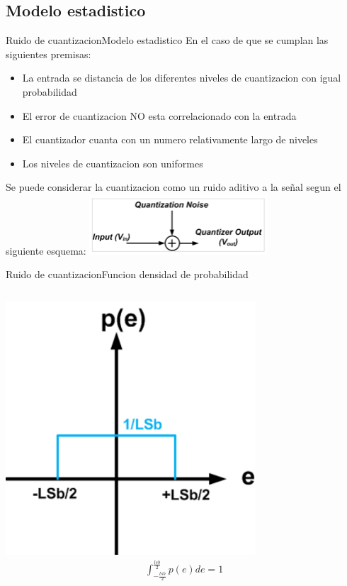  \subsection{Modelo estadistico}
 \begin{frame}{Ruido de cuantizacion}{Modelo estadistico}
    En el caso de que se cumplan las siguientes premisas:
    \begin{itemize}
       \item La entrada se distancia de los diferentes niveles de cuantizacion con igual probabilidad
       \item El error de cuantizacion NO esta correlacionado con la entrada
       \item El cuantizador cuanta con un numero relativamente largo de niveles
       \item Los niveles de cuantizacion son uniformes
    \end{itemize}
    Se puede considerar la cuantizacion como un ruido aditivo a la señal segun el siguiente esquema:
    \center\includegraphics[width=0.5\textwidth]{1_clase/noise_model}
    \vfill
 \end{frame}
 \begin{frame}{Ruido de cuantizacion}{Funcion densidad de probabilidad}
    \begin{columns}[onlytextwidth]
       \center\includegraphics[width=0.7\textwidth]{1_clase/noise_funcion_probabilidad}
       \begin{align*}
          \int^\frac{lsb}{2}_{-\frac{lsb}{2}} p(e) de = 1 \\
       \end{align*}
    \end{columns}
    \vfill
 \end{frame}
